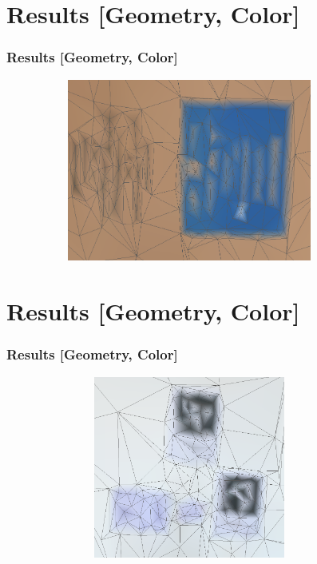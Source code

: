 \documentclass[
	10pt,
	t		%
]{beamer}
\begin{document}
\section{Results [Geometry, Color]}
\begin{frame}
\frametitle{Results [Geometry, Color]}
\centering
\begin{figure}[ht]
\centering
\includegraphics[width=10cm,height=6cm]{color_3}
\end{figure}
\end{frame}

\section{Results [Geometry, Color]}
\begin{frame}
\frametitle{Results [Geometry, Color]}
\centering
\begin{figure}[ht]
\centering
\includegraphics[width=10cm,height=6cm]{color_6}
\end{figure}
\end{frame}
\end{document}
